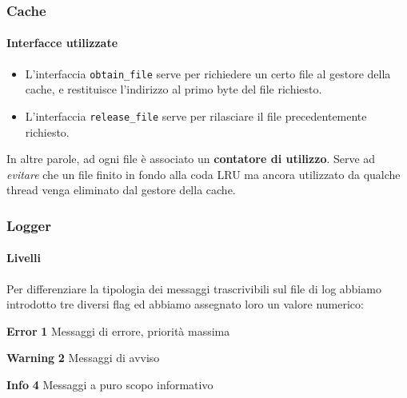 \documentclass{beamer}
\begin{document}
\begin{frame}[fragile]
\frametitle{Cache}
\framesubtitle{Interfacce utilizzate}

\begin{itemize}


\item L'interfaccia \texttt{obtain\_file} serve per richiedere un certo file al gestore della cache, e
restituisce l'indirizzo al primo byte del file richiesto.

\item L'interfaccia \texttt{release\_file} serve per rilasciare il file precedentemente richiesto.
\end{itemize}

In altre parole, ad ogni file è associato un \textbf{contatore di utilizzo}. Serve ad \textit{evitare} che un file finito in fondo alla coda LRU ma ancora utilizzato da qualche thread venga eliminato dal gestore della cache.


\end{frame}

\begin{frame}
\frametitle{Logger}
\framesubtitle{Livelli}

Per differenziare la tipologia dei messaggi trascrivibili sul file di log abbiamo
introdotto tre diversi flag ed abbiamo assegnato loro un valore numerico:

\medskip
\medskip

\textbf{Error} \hspace{1.2cm} \textbf{1} \hspace{1cm} Messaggi di errore, priorità massima

\medskip

\textbf{Warning} \hspace{0.64cm} \textbf{2} \hspace{1cm} Messaggi di avviso

\medskip

\textbf{Info} \hspace{1.4cm} \textbf{4} \hspace{1cm} Messaggi a puro scopo informativo

\medskip
\medskip
\medskip


\end{frame}
\end{document}
